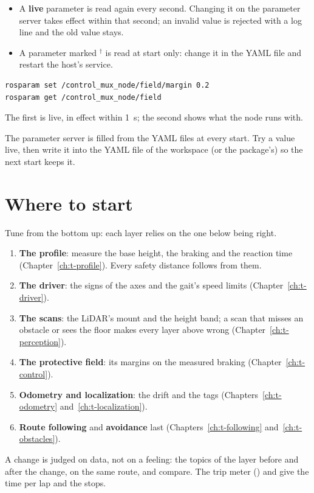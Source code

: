 \begin{itemize}
  \item A \textbf{live} parameter is read again every second. Changing it on the parameter server
    takes effect within that second; an invalid value is rejected with a log line and the old
    value stays.
  \item A parameter marked $^\dagger$ is read at start only: change it in the YAML file and
    restart the host's service.
\end{itemize}

\begin{lstlisting}[language=bash]
rosparam set /control_mux_node/field/margin 0.2
rosparam get /control_mux_node/field
\end{lstlisting}

The first is live, in effect within 1~s; the second shows what the node runs with.

\begin{warnbox}
The parameter server is filled from the YAML files at every start. Try a value live, then write
it into the YAML file of the workspace (or the package's) so the next start keeps it.
\end{warnbox}

\section{Where to start}

Tune from the bottom up: each layer relies on the one below being right.

\begin{enumerate}
  \item \textbf{The profile}: measure the base height, the braking and the reaction time
    (Chapter~\ref{ch:t-profile}). Every safety distance follows from them.
  \item \textbf{The driver}: the signs of the axes and the gait's speed limits
    (Chapter~\ref{ch:t-driver}).
  \item \textbf{The scans}: the LiDAR's mount and the height band; a scan that misses an obstacle
    or sees the floor makes every layer above wrong (Chapter~\ref{ch:t-perception}).
  \item \textbf{The protective field}: its margins on the measured braking
    (Chapter~\ref{ch:t-control}).
  \item \textbf{Odometry and localization}: the drift and the tags (Chapters~\ref{ch:t-odometry}
    and~\ref{ch:t-localization}).
  \item \textbf{Route following} and \textbf{avoidance} last (Chapters~\ref{ch:t-following}
    and~\ref{ch:t-obstacles}).
\end{enumerate}

\begin{tipbox}
A change is judged on data, not on a feeling:  the topics of the layer before
and after the change, on the same route, and compare. The trip meter
() and  give the time per lap and the stops.
\end{tipbox}

